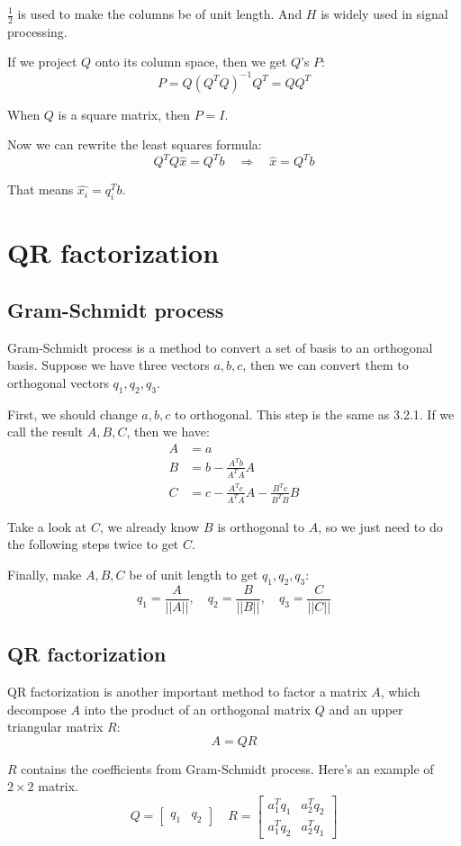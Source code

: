 \documentclass[10pt,a4paper,oneside,numbers=noenddot]{scrbook}
\theoremstyle{ctplain}
\theoremstyle{ctresult}
\begin{document}
$\frac12$ is used to make the columns be of unit length. And $H$ is widely used in
signal processing.

If we project $Q$ onto its column space, then we get $Q$'s $P$:
\[
  P = Q(Q^{T}Q)^{-1}Q^{T} = QQ^{T}
\]

When $Q$ is a square matrix, then $P = I$.

Now we can rewrite the least squares formula:
\[
  Q^{T}Q\hat{x} = Q^{T}b \quad \Rightarrow \quad \hat{x} = Q^{T}b
\]

That means $\hat{x_i} = $$q_i^{T}b$.

\section{QR factorization}
\subsection{Gram-Schmidt process}

Gram-Schmidt process is a method to convert a set of basis to an orthogonal basis. Suppose
we have three vectors $a, b, c$, then we can convert them to orthogonal vectors $q_1, q_2,
q_3$.

First, we should change $a, b, c$ to orthogonal. This step is the same as 3.2.1. If we
call the result $A, B, C$, then we have:
\begin{align*}
  A &= a \\
  B &= b - \frac{A^{T}b}{A^{T}A}A \\
  C &= c - \frac{A^{T}c}{A^{T}A}A - \frac{B^{T}c}{B^{T}B}B
\end{align*}

Take a look at $C$, we already know $B$ is orthogonal to $A$, so we just need to do the
following steps twice to get $C$.

Finally, make $A, B, C$ be of unit length to get $q_1, q_2, q_3$:
\[
  q_1 = \frac{A}{||A||}, \quad q_2 = \frac{B}{||B||}, \quad q_3 = \frac{C}{||C||}
\]

\subsection{QR factorization}

QR factorization is another important method to factor a matrix $A$, which decompose
$A$ into the product of an orthogonal matrix $Q$ and an upper triangular matrix $R$:
\[
A = QR
\]

$R$ contains the coefficients from Gram-Schmidt process. Here's an example of $2 \times 2$
matrix.
\[
  Q = \begin{bmatrix} q_1 & q_2 \end{bmatrix} \quad
  R = \begin{bmatrix}
    a_1^{T}q_1 & a_2^{T}q_2 \\
    a_1^{T}q_2 & a_2^{T}q_1
  \end{bmatrix}
\]
\end{document}
